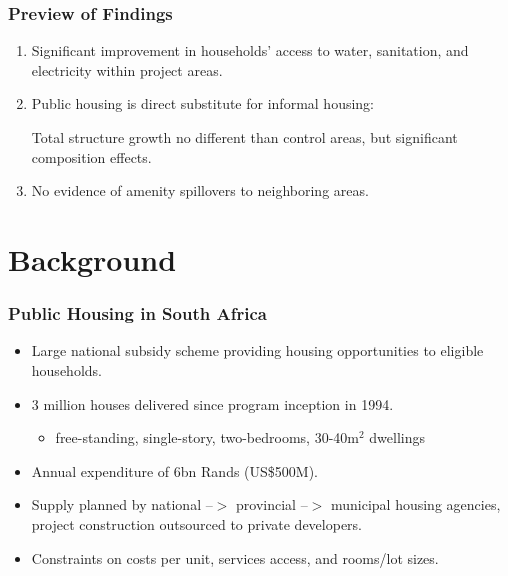 \documentclass[aspectratio=32]{beamer}
\begin{document}
\begin{frame}
\frametitle{Preview of Findings}

\centering
\begin{enumerate}


\item<1-> Significant improvement in households' access to water, sanitation, and electricity within project areas.
\vspace{2mm}
\item<2-> Public housing is direct substitute for informal housing: 

Total structure growth no different than control areas, but significant composition effects.
\vspace{2mm}
\item<3-> No evidence of amenity spillovers to neighboring areas. 

\end{enumerate}

\end{frame}


\section{Background}


\begin{frame}
\frametitle{Public Housing in South Africa}
  \begin{itemize}
    \item Large national subsidy scheme providing housing opportunities to eligible households.
    \vspace{2mm}
    \item 3 million houses delivered since program inception in 1994.\
        \begin{itemize}
          \item free-standing, single-story, two-bedrooms, 30-40$\text{m}^2$ dwellings
        \end{itemize}
    \vspace{2mm}
    \item Annual expenditure of 6bn Rands (US\$500M).
    \vspace{2mm}
    \item Supply planned by national --$>$ provincial --$>$ municipal housing agencies, project construction outsourced to private developers.
    \vspace{2mm} 
    \item Constraints on costs per unit, services access, and rooms/lot sizes.
  \end{itemize}
\end{frame}
\end{document}
